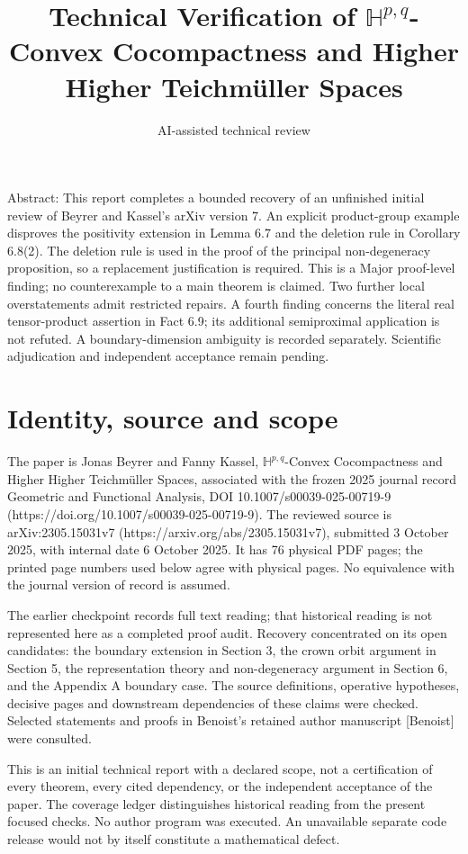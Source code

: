 \documentclass[10pt]{article}
\title{Technical Verification of
\(\mathbb H^{p,q}\)-Convex Cocompactness and
Higher Higher Teichmüller Spaces}
\author{AI-assisted technical review}
\date{}
\begin{document}
\maketitle
Abstract: This report completes a bounded recovery of an unfinished initial review of Beyrer and Kassel’s arXiv version 7. An explicit product-group example disproves the positivity extension in Lemma 6.7 and the deletion rule in Corollary 6.8(2). The deletion rule is used in the proof of the principal non-degeneracy proposition, so a replacement justification is required. This is a Major proof-level finding; no counterexample to a main theorem is claimed. Two further local overstatements admit restricted repairs. A fourth finding concerns the literal real tensor-product assertion in Fact 6.9; its additional semiproximal application is not refuted. A boundary-dimension ambiguity is recorded separately. Scientific adjudication and independent acceptance remain pending.\par
\section*{Identity, source and scope}
The paper is Jonas Beyrer and Fanny Kassel, \(\mathbb H^{p,q}\)-Convex Cocompactness and Higher Higher Teichmüller Spaces, associated with the frozen 2025 journal record Geometric and Functional Analysis, DOI 10.1007/s00039-025-00719-9 (https://doi.org/10.1007/s00039-025-00719-9). The reviewed source is arXiv:2305.15031v7 (https://arxiv.org/abs/2305.15031v7), submitted 3 October 2025, with internal date 6 October 2025. It has 76 physical PDF pages; the printed page numbers used below agree with physical pages. No equivalence with the journal version of record is assumed.\par
The earlier checkpoint records full text reading; that historical reading is not represented here as a completed proof audit. Recovery concentrated on its open candidates: the boundary extension in Section 3, the crown orbit argument in Section 5, the representation theory and non-degeneracy argument in Section 6, and the Appendix A boundary case. The source definitions, operative hypotheses, decisive pages and downstream dependencies of these claims were checked. Selected statements and proofs in Benoist’s retained author manuscript [Benoist] were consulted.\par
This is an initial technical report with a declared scope, not a certification of every theorem, every cited dependency, or the independent acceptance of the paper. The coverage ledger distinguishes historical reading from the present focused checks. No author program was executed. An unavailable separate code release would not by itself constitute a mathematical defect.\par
\end{document}
